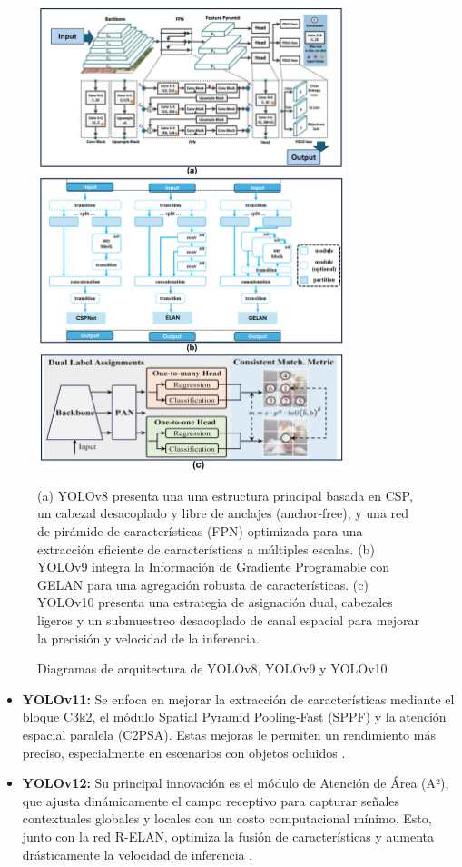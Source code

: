 \documentclass[12pt,a4paper,onecolumn,oneside]{report}
\begin{document}
\begin{figure}[htbp]
  \centering
  \includegraphics[width=0.8\textwidth]{figuras/arquitecture YOLO/v8_v9_v10.png}
  \caption{Diagramas de arquitectura de YOLOv8, YOLOv9 y YOLOv10}
  \label{fig:Yolov8_v9_v10_arquitectures}
  (a) YOLOv8 presenta una una estructura principal basada en CSP, un cabezal desacoplado y libre de anclajes (anchor-free), y una red de pirámide de características (FPN) optimizada para una extracción eficiente de características a múltiples escalas. 
  (b) YOLOv9 integra la Información de Gradiente Programable con GELAN para una agregación robusta de características.
  (c) YOLOv10 presenta una estrategia de asignación dual, cabezales ligeros y un submuestreo desacoplado de canal espacial para mejorar la precisión y velocidad de la inferencia.
\end{figure}

\begin{itemize}
  \item \textbf{YOLOv11:} Se enfoca en mejorar la extracción de características mediante el bloque C3k2, el módulo Spatial Pyramid Pooling-Fast (SPPF) y la atención espacial paralela (C2PSA). Estas mejoras le permiten un rendimiento más preciso, especialmente en escenarios con objetos ocluidos \cite{defyolos}.
  \item \textbf{YOLOv12:} Su principal innovación es el módulo de Atención de Área (A²), que ajusta dinámicamente el campo receptivo para capturar señales contextuales globales y locales con un costo computacional mínimo. Esto, junto con la red R-ELAN, optimiza la fusión de características y aumenta drásticamente la velocidad de inferencia \cite{defyolos}.
\end{itemize}
\end{document}
